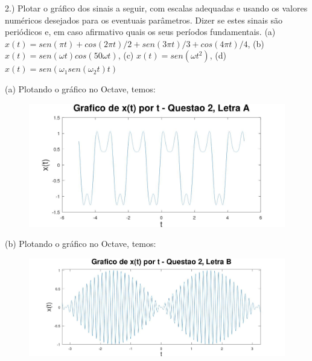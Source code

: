 \documentclass{article}
\begin{document}
2.) Plotar o gráfico dos sinais a seguir, com escalas adequadas e usando os valores numéricos desejados para os eventuais parâmetros. Dizer se estes sinais são periódicos e, em caso afirmativo quais os seus períodos fundamentais.
(a) $x(t) = sen(\pi t) + cos(2 \pi t) / 2 + sen(3 \pi t) / 3 + cos(4 \pi t) / 4$,
(b) $x(t) = sen(\omega t)cos(50\omega t)$,
(c) $x(t) = sen(\omega t^2)$,
(d) $x(t) = sen(\omega_{1}sen(\omega_{2}t)t)$

\vspace{\baselineskip}

(a) Plotando o gráfico no Octave, temos:

\vspace{\baselineskip}

\begin{figure}[h!]
    \includegraphics[scale=0.3]{plot2a}
    \centering
\end{figure}

\newpage

(b) Plotando o gráfico no Octave, temos:

\vspace{\baselineskip}

\begin{figure}[h!]
    \includegraphics[scale=0.3]{plot2b}
    \centering
\end{figure}

\vspace{\baselineskip}
\end{document}
